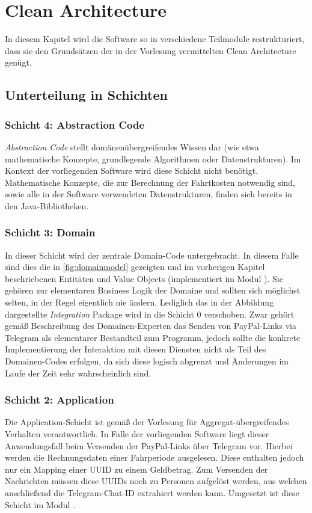 \chapter{Clean Architecture}
In diesem Kapitel wird die Software so in verschiedene Teilmodule restrukturiert, dass sie den Grundsätzen der in der Vorlesung vermittelten Clean Architecture genügt.

\section{Unterteilung in Schichten}
\subsection{Schicht 4: Abstraction Code}
\emph{Abstraction Code} stellt domänenübergreifendes Wissen dar (wie etwa mathematische Konzepte, grundlegende Algorithmen oder Datenstrukturen).
Im Kontext der vorliegenden Software wird diese Schicht nicht benötigt.
Mathematische Konzepte, die zur Berechnung der Fahrtkosten notwendig sind, sowie alle in der Software verwendeten Datenstrukturen, finden sich bereits in den Java-Bibliotheken.

\subsection{Schicht 3: Domain}
In dieser Schicht wird der zentrale Domain-Code untergebracht.
In diesem Falle sind dies die in \autoref{fig:domainmodel} gezeigten und im vorherigen Kapitel beschriebenen Entitäten und Value Objects (implementiert im Modul ).
Sie gehören zur elementaren Business Logik der Domaine und sollten sich möglichst selten, in der Regel eigentlich nie ändern.
Lediglich das in der Abbildung dargestellte \emph{Integration} Package wird in die Schicht 0 verschoben.
Zwar gehört gemäß Beschreibung des Domainen-Experten das Senden von PayPal-Links via Telegram als elementarer Bestandteil zum Programm, jedoch sollte die konkrete Implementierung der Interaktion mit diesen Diensten nicht als Teil des Domainen-Codes erfolgen, da sich diese logisch abgrenzt und Änderungen im Laufe der Zeit sehr wahrscheinlich sind.

\subsection{Schicht 2: Application}
Die Application-Schicht ist gemäß der Vorlesung für Aggregat-übergreifendes Verhalten verantwortlich.
In Falle der vorliegenden Software liegt dieser Anwendungsfall beim Versenden der PayPal-Links über Telegram vor.
Hierbei werden die Rechnungsdaten einer Fahrperiode ausgelesen.
Diese enthalten jedoch nur ein Mapping einer UUID zu einem Geldbetrag.
Zum Versenden der Nachrichten müssen diese UUIDs noch zu Personen aufgelöst werden, aus welchen anschließend die Telegram-Chat-ID extrahiert werden kann.
Umgesetzt ist diese Schicht im Modul .

